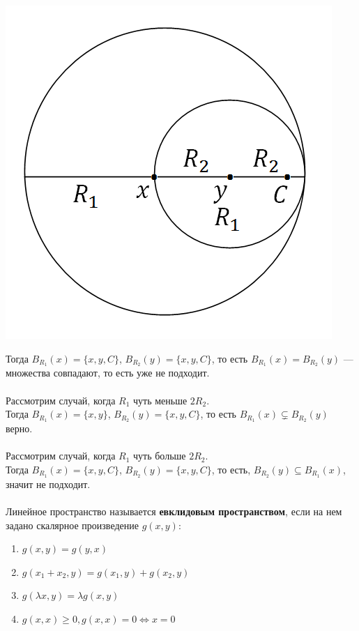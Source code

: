 \documentclass[a4paper,12pt]{article}
\begin{document}
\begin{defintion}
\begin{center}
	\includegraphics[scale=0.55]{l4_13.png}\end{center}
Тогда $B_{R_1}(x) = \{x, y, C\}$, $B_{R_2}(y) = \{x, y, C\}$, то есть $B_{R_1}(x) = B_{R_2}(y)$ --- множества совпадают, то есть уже не подходит.\\
\\
Рассмотрим случай, когда $R_1$ чуть меньше $2R_2$.\\
Тогда $B_{R_1}(x) = \{x, y\}$, $B_{R_2}(y) = \{x, y, C\}$, то есть $B_{R_1}(x) \subsetneq B_{R_2}(y)$ верно.\\
\\
Рассмотрим случай, когда $R_1$ чуть больше $2R_2$.\\
Тогда $B_{R_1}(x) = \{x, y, C\}$, $B_{R_2}(y) = \{x, y, C\}$, то есть, $B_{R_2}(y) \subseteq B_{R_1}(x)$, значит не подходит.\\
\\
Линейное пространство называется \textbf{евклидовым пространством}, если на нем задано скалярное произведение $g(x, y)$:\begin{enumerate}
	\item $g(x, y) = g(y, x)$
	\item $g(x_1+x_2, y) = g(x_1, y)+g(x_2, y)$
	\item $g(\lambda x, y) = \lambda g(x, y)$
	\item $g(x, x) \geqslant 0, g(x, x) = 0 \Leftrightarrow x = 0$
\end{enumerate}

\end{defintion}
\end{document}
